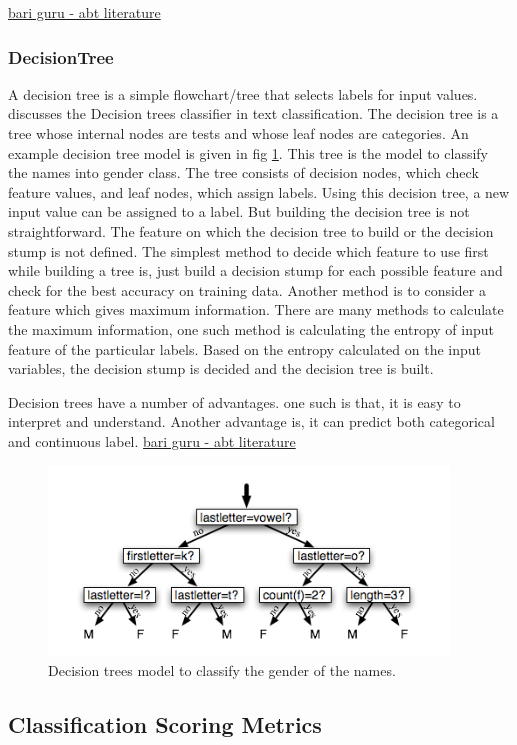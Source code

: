 \underline{bari guru - abt literature }

\subsubsection{DecisionTree}
A decision tree is a simple flowchart/tree that selects labels for input values. \cite{BirdKleinLoper09} discusses the Decision trees classifier in text classification. The decision tree is a tree whose internal nodes are tests and whose leaf nodes are categories. An example decision tree model is given in fig \ref{fig:Decision_tree}. This tree is the model to classify the names into gender class. The tree consists of decision nodes, which check feature values, and leaf nodes, which assign labels. Using this decision tree, a new input value can be assigned to a label. But building the decision tree is not straightforward. The feature on which the decision tree to build or the decision stump is not defined. The simplest method to decide which feature to use first while building a tree is, just build a decision stump for each possible feature and check for the best accuracy on training data. Another method is to consider a feature which gives maximum information. There are many methods to calculate the maximum information, one such method is calculating the entropy of input feature of the particular labels. Based on the entropy calculated on the input variables, the decision stump is decided and the decision tree is built.

Decision trees have a number of advantages. one such is that, it is easy to interpret and understand. Another advantage is, it can predict both categorical and continuous label. \underline{bari guru - abt literature }



\begin{figure}
	\centering
	\includegraphics[width=0.5\linewidth]{images/Decisiontrees.png}
	\caption{Decision trees model to classify the gender of the names.}
	\label{fig:Decision_tree}
\end{figure}

\subsection{Classification Scoring Metrics} \label{scoringmetrics} \label{metricsofclassification}

